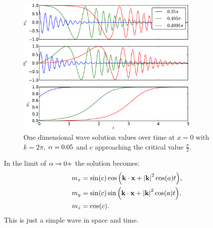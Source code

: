 \begin{figure}
  \centering
  \includegraphics[width=0.8\textwidth]{plots/wave_exact_solution_parameters/exact_solution_parameters_complex.pdf}
  \caption{One dimensional wave solution values over time at $x=0$ with $k = 2\pi$, $\alpha = 0.05$ and $c$ approaching the critical value $\frac{\pi}{2}$.}
  \label{fig:wave-solution-vary-c-complex}
\end{figure}


In the limit of $\alpha \rightarrow 0+$ the solution becomes\cite{Fuwa2006}:
\begin{equation}
  \begin{aligned}
    m_x &= \sin(c) \cos{\left( \mathbf{k}\cdot \mathbf{x}+ \left|{\mathbf{k}} \right|^2 \cos(a) t \right)}, \\
    m_y &= \sin(c) \sin{\left( \mathbf{k}\cdot \mathbf{x}+ \left|{\mathbf{k}} \right|^2 \cos(a) t \right)}, \\
    m_z &= \cos(c).
  \end{aligned}
\end{equation}
This is just a simple wave in space and time.


